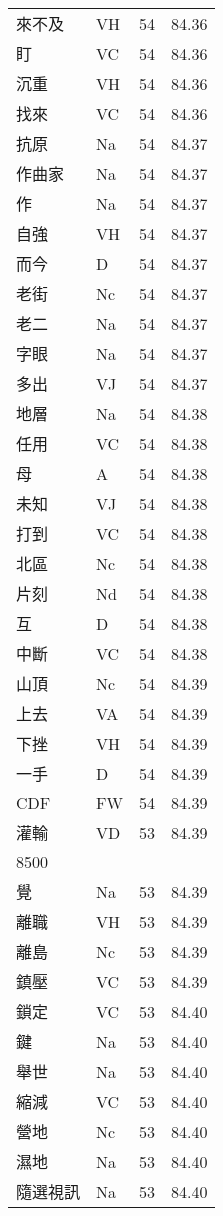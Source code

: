 \documentclass[twocolumn]{book}
\begin{document}
\begin{supertabular}{llrr}
來不及 & VH & 54 &  84.36\\
盯 & VC & 54 &  84.36\\
沉重 & VH & 54 &  84.36\\
找來 & VC & 54 &  84.36\\
抗原 & Na & 54 &  84.37\\
作曲家 & Na & 54 &  84.37\\
作 & Na & 54 &  84.37\\
自強 & VH & 54 &  84.37\\
而今 & D & 54 &  84.37\\
老街 & Nc & 54 &  84.37\\
老二 & Na & 54 &  84.37\\
字眼 & Na & 54 &  84.37\\
多出 & VJ & 54 &  84.37\\
地層 & Na & 54 &  84.38\\
任用 & VC & 54 &  84.38\\
母 & A & 54 &  84.38\\
未知 & VJ & 54 &  84.38\\
打到 & VC & 54 &  84.38\\
北區 & Nc & 54 &  84.38\\
片刻 & Nd & 54 &  84.38\\
互 & D & 54 &  84.38\\
中斷 & VC & 54 &  84.38\\
山頂 & Nc & 54 &  84.39\\
上去 & VA & 54 &  84.39\\
下挫 & VH & 54 &  84.39\\
一手 & D & 54 &  84.39\\
CDF & FW & 54 &  84.39\\
灌輸 & VD & 53 &  84.39\\
8500\\
覺 & Na & 53 &  84.39\\
離職 & VH & 53 &  84.39\\
離島 & Nc & 53 &  84.39\\
鎮壓 & VC & 53 &  84.39\\
鎖定 & VC & 53 &  84.40\\
鍵 & Na & 53 &  84.40\\
舉世 & Na & 53 &  84.40\\
縮減 & VC & 53 &  84.40\\
營地 & Nc & 53 &  84.40\\
濕地 & Na & 53 &  84.40\\
隨選視訊 & Na & 53 &  84.40\\

\end{supertabular}
\end{document}
